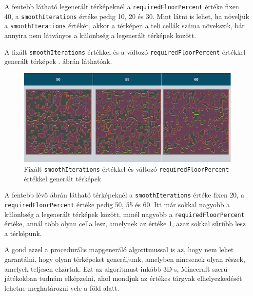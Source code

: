 A fentebb látható legenerált térképeknél a \texttt{requiredFloorPercent} értéke fixen 40, a \texttt{smoothIterations} értéke pedig 10, 20 és 30. Mint látni is lehet, ha növeljük a \texttt{smoothIterations} értékét, akkor a térképen a teli cellák száma növekszik, bár annyira nem látványos a különbség a legenerált térképek között. 

A fixált \texttt{smoothIterations} értékkel és a változó \texttt{requiredFloorPercent} értékkel generált térképek . ábrán láthatóak.

\begin{figure}[ht]
\centering
\includegraphics[width=\textwidth]{images/fixedsmoothcellular.png}
\caption{Fixált \texttt{smoothIterations} értékkel és változó \texttt{requiredFloorPercent} értékkel generált térképek}
\label{fig:fixedSmoothCellular}
\end{figure}

\newpage
A fentebb lévő ábrán látható térképeknél a \texttt{smoothIterations} értéke fixen 20, a \texttt{requiredFloorPercent} értéke pedig 50, 55 és 60. Itt már sokkal nagyobb a különbség a legenerált térképek között, minél nagyobb a \texttt{requiredFloorPercent} értéke, annál több olyan cella lesz, amelynek az értéke 1, azaz sokkal sűrűbb lesz a térképünk.

A gond ezzel a procedurális mapgeneráló algoritmussal is az, hogy nem lehet garantálni, hogy olyan térképeket generáljunk, amelyben nincsenek olyan részek, amelyek teljesen elzártak. Ezt az algoritmust inkább 3D-s, Minecraft szerű játékokban tudnám elképzelni, ahol mondjuk az értékes tárgyak elhelyezkedését lehetne meghatározni vele a föld alatt.


